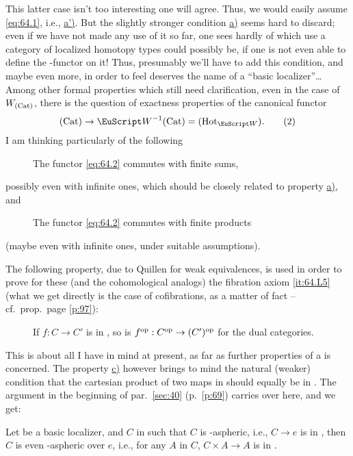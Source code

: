 This latter case isn't too interesting one will agree. Thus, we would
easily assume \eqref{eq:64.1}, i.e.,
\hyperref[it:64.Laprime]{a')}. But the slightly stronger condition
\hyperref[it:64.La]{a)} seems hard to discard; even if we have not
made any use of it so far, one sees hardly of which use a category of
localized homotopy types \HotW{} could possibly be, if one is not even
able to define the \piz-functor on it! Thus, presumably we'll have to
add this condition, and maybe even more, in order to feel \scrW{}
deserves the name of a ``basic localizer''\ldots Among other formal
properties which still need clarification, even in the case of
$W_{(\mathrm{Cat})}$, there is the question of exactness properties of the
canonical functor
\begin{equation}
  \label{eq:64.2}
  \Cat\to\scrW^{-1}\Cat=\HotW.\tag{2}
\end{equation}
I am thinking particularly of the following
\begin{description}
\item[]
  The functor \eqref{eq:64.2} commutes with finite sums,
\end{description}
possibly even with infinite ones, which should be closely related to
property \hyperref[it:64.La]{a)}, and
\begin{description}
\item[]
  The functor \eqref{eq:64.2} commutes with finite products
\end{description}
(maybe even with infinite ones, under suitable assumptions).

The following property, due to Quillen for weak equivalences, is used
in order to prove for these (and the cohomological analogs) the
fibration axiom \ref{it:64.L5} (what we get directly is the case of
cofibrations, as a matter of fact -- cf.\ prop.\ page \ref{p:97}):
\begin{description}
\item[]
  If $f:C\to C'$ is in \scrW, so is $f^{\mathrm{op}}:C^{\mathrm{op}}\to(C')^{\mathrm{op}}$ for the dual
  categories.
\end{description}

This is about all I have in mind at present, as far as further
properties of a \scrW{} is concerned. The property
\hyperref[it:64.Lc]{c)} however brings to mind the natural (weaker)
condition that the cartesian product of two maps in \scrW{} should
equally be in \scrW. The argument in the beginning of par.\
\ref{sec:40} (p.\ \ref{p:69}) carries over here, and we get:
\begin{proposition}
  Let \scrW{} be a basic localizer, and $C$ in \Cat{} such that $C$ is
  \scrW-aspheric, i.e., $C\to e$ is in \scrW, then $C$ is even
  \scrW-aspheric over $e$, i.e., for any $A$ in $C$, $C\times A\to A$
  is in \scrW.
\end{proposition}

